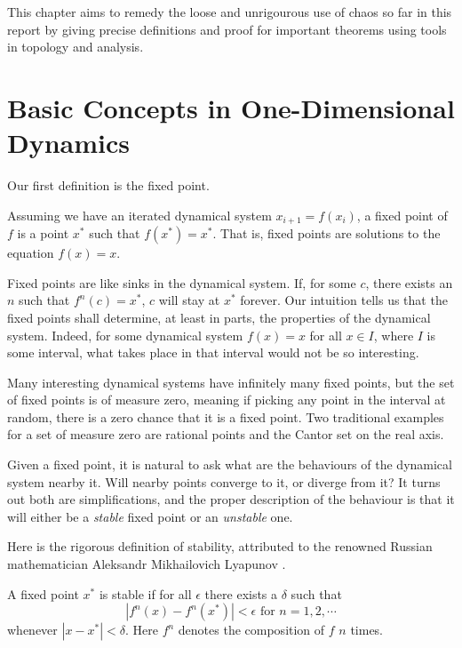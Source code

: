 This chapter aims to remedy the loose and unrigourous use of chaos so far in this report by giving precise definitions and proof for important theorems using tools in topology and analysis.

\section{Basic Concepts in One-Dimensional Dynamics}

Our first definition is the fixed point.

\begin{defn}
	Assuming we have an iterated dynamical system $x_{i+1} = f(x_i)$, a fixed point of $f$ is a point $x^*$ such that $f(x^*) = x^*$. 
	That is, fixed points are solutions to the equation $f(x) = x$.
\end{defn}

Fixed points are like sinks in the dynamical system. 
If, for some $c$, there exists an $n$ such that $f^n(c) = x^*$, $c$ will stay at $x^*$ forever. 
Our intuition tells us that the fixed points shall determine, at least in parts, the properties of the dynamical system.
Indeed, for some dynamical system $f(x) = x$ for all $x \in I$, where $I$ is some interval, what takes place in that interval would not be so interesting.

Many interesting dynamical systems have infinitely many fixed points, but the set of fixed points is of measure zero, meaning if picking any point in the interval at random, there is a zero chance that it is a fixed point.
Two traditional examples for a set of measure zero are rational points and the Cantor set on the real axis. 

Given a fixed point, it is natural to ask what are the behaviours of the dynamical system nearby it.
Will nearby points converge to it, or diverge from it?
It turns out both are simplifications, and the proper description of the behaviour is that it will either be a \emph{stable} fixed point or an \emph{unstable} one. 

Here is the rigorous definition of stability, attributed to the renowned Russian mathematician Aleksandr Mikhailovich Lyapunov \cite{lyapunov}.

\begin{defn}
A fixed point $x^*$ is stable if for all $\epsilon$ there exists a $\delta$ such that 
$$
	|f^n(x) - f^n(x^*)| < \epsilon \text{ for } n = 1,2, \cdots 
$$
whenever $|x - x^*| < \delta$.
Here $f^n$ denotes the composition of $f$ $n$ times.
\end{defn}

